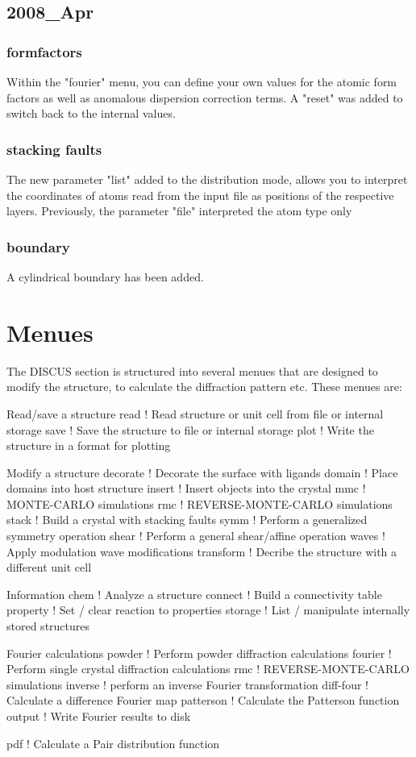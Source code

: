 \subsection*{2008\_Apr}
\subsubsection{formfactors}
Within the "fourier" menu, you can define your own values for 
the atomic form factors as well as anomalous dispersion correction 
terms. A "reset" was added to switch back to the internal values. 
\subsubsection{stacking faults}
\par
The new parameter "list" added to the distribution mode, allows 
you to interpret the coordinates of atoms read from the input 
file as positions of the respective layers. 
Previously, the parameter "file" interpreted the atom type only 
\subsubsection{boundary}
\par
A cylindrical boundary has been added. 
\section{Menues}
\par
The DISCUS section is structured into several menues that 
are designed to modify the structure, to calculate the 
diffraction pattern etc. 
These menues are: 
\par
Read/save a structure 
read       ! Read structure or unit cell from file or internal storage 
save       ! Save the structure to file or internal storage 
plot       ! Write the structure in a format for plotting 
\par
Modify a structure 
decorate   ! Decorate the surface with ligands 
domain     ! Place domains into host structure 
insert     ! Insert objects into the crystal 
mmc        ! MONTE-CARLO simulations 
rmc        ! REVERSE-MONTE-CARLO simulations 
stack      ! Build a crystal with stacking faults 
symm       ! Perform a generalized symmetry operation 
shear      ! Perform a general shear/affine operation 
waves      ! Apply modulation wave modifications 
transform  ! Decribe the structure with a different unit cell 
\par
Information 
chem       ! Analyze a structure 
connect    ! Build a connectivity table 
property   ! Set / clear reaction to properties 
storage    ! List / manipulate internally stored structures 
\par
Fourier calculations 
powder     ! Perform powder diffraction calculations 
fourier    ! Perform single crystal diffraction calculations 
rmc        ! REVERSE-MONTE-CARLO simulations 
inverse    ! perform an inverse Fourier transformation 
diff-four  ! Calculate a difference Fourier map 
patterson  ! Calculate the Patterson function 
output     ! Write Fourier results to disk 
\par
pdf        ! Calculate a Pair distribution function 
